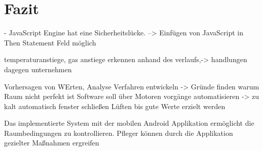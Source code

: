\chapter{Fazit}

- JavaScript Engine hat eine Sicherheitslücke. --> Einfügen von JavaScript in Then Statement Feld möglich

temperaturanstiege, gas anstiege erkennen anhand des verlaufs,-> handlungen dagegen unternehmen


Vorhersagen von WErten,
Analyse Verfahren entwickeln -> Gründe finden warum Raum nicht perfekt ist
Software soll über Motoren vorgänge automatisieren -> zu kalt automatisch fenster schließen
Lüften bis gute Werte erzielt werden

Das implementierte System mit der mobilen Android Applikation ermöglicht die Raumbedingungen zu kontrollieren. Pfleger können durch die Applikation gezielter Maßnahmen ergreifen 